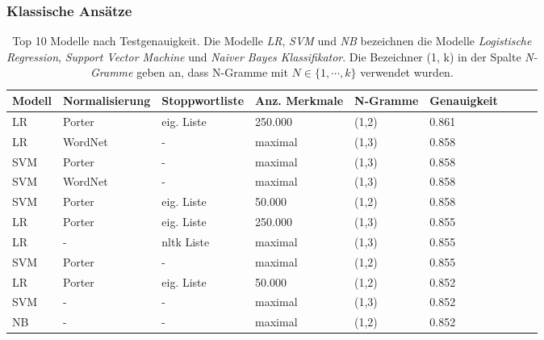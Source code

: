 \subsubsection{Klassische Ansätze}

\begin{table}
    \begin{tabular}{lllllllrr}
        \toprule
        Modell & Normalisierung & Stoppwortliste   & Anz. Merkmale & N-Gramme & Genauigkeit \\
        \midrule
        LR     & Porter         & eig. Liste       & 250.000       & (1,2)    & 0.861       \\
        LR     & WordNet        & -                & maximal       & (1,3)    & 0.858       \\
        SVM    & Porter         & -                & maximal       & (1,3)    & 0.858       \\
        SVM    & WordNet        & -                & maximal       & (1,3)    & 0.858       \\
        SVM    & Porter         & eig. Liste       & 50.000        & (1,2)    & 0.858       \\
        LR     & Porter         & eig. Liste       & 250.000       & (1,3)    & 0.855       \\
        LR     & -              & \gls{nltk} Liste & maximal       & (1,3)    & 0.855       \\
        SVM    & Porter         & -                & maximal       & (1,2)    & 0.855       \\
        LR     & Porter         & eig. Liste       & 50.000        & (1,2)    & 0.852       \\
        SVM    & -              & -                & maximal       & (1,3)    & 0.852       \\
        NB     & -              & -                & maximal       & (1,2)    & 0.852       \\
        \bottomrule
    \end{tabular}
    \caption{
        Top 10 Modelle nach Testgenauigkeit.
        Die Modelle \textit{LR}, \textit{SVM} und \textit{NB} bezeichnen die Modelle \textit{Logistische Regression}, \textit{Support Vector Machine} und \textit{Naiver Bayes Klassifikator}.
        Die Bezeichner (1, k) in der Spalte \textit{N-Gramme} geben an, dass N-Gramme mit $N\in\lbrace1,\cdots,k\rbrace$ verwendet wurden.
    }
    \label{tab:top-10-models}
\end{table}

